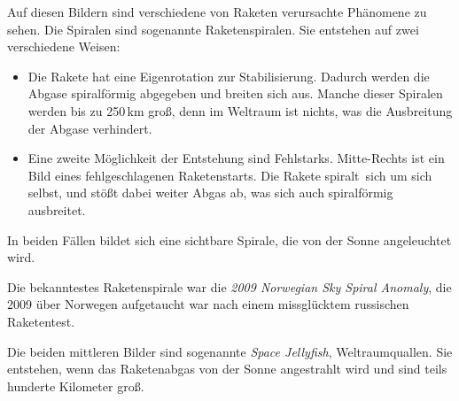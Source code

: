 \documentclass{scrartcl}
\begin{document}
Auf diesen Bildern sind verschiedene von Raketen verursachte Phänomene zu sehen. Die Spiralen sind sogenannte Raketenspiralen. Sie entstehen auf zwei verschiedene Weisen:

\begin{itemize}
	\item Die Rakete hat eine Eigenrotation zur Stabilisierung. Dadurch werden die Abgase spiralförmig abgegeben und breiten sich aus. Manche dieser Spiralen werden bis zu 250\,km groß, denn im Weltraum ist nichts, was die Ausbreitung der Abgase verhindert.
	\item Eine zweite Möglichkeit der Entstehung sind Fehlstarks. Mitte-Rechts ist ein Bild eines fehlgeschlagenen Raketenstarts. Die Rakete \frq spiralt\flq\ sich um sich selbst, und stößt dabei weiter Abgas ab, was sich auch spiralförmig ausbreitet.
\end{itemize}

In beiden Fällen bildet sich eine sichtbare Spirale, die von der Sonne angeleuchtet wird.

Die bekanntestes Raketenspirale war die \textit{2009 Norwegian Sky Spiral Anomaly}, die 2009 über Norwegen aufgetaucht war nach einem missglücktem russischen Raketentest.

Die beiden mittleren Bilder sind sogenannte \textit{Space Jellyfish}, \frq Weltraumquallen\flq. Sie entstehen, wenn das Raketenabgas von der Sonne angestrahlt wird und sind teils hunderte Kilometer groß.
\end{document}
